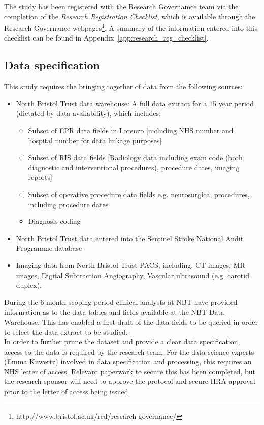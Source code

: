 \documentclass{article}
\begin{document}
The study has been registered with the Research Governamce team via
the completion of the \textit{Research Registration Checklist}, which
is available through the Research Governance
webpages\footnote{http://www.bristol.ac.uk/red/research-governance/}.
A summary of the information entered into this checklist can be found
in Appendix~\ref{app:research_reg_checklist}.

\subsection{Data specification}

This study requires the bringing together of data from the
following sources:
\begin{itemize}
\item	North Bristol Trust data warehouse: A full data extract for a 15 year period (dictated by data availability), which includes: 
  \begin{itemize}
  \item	Subset of EPR data fields in Lorenzo [including NHS number and hospital number for data linkage purposes] 
  \item	Subset of RIS data fields [Radiology data including exam code (both diagnostic and interventional procedures), procedure dates, imaging reports]
  \item	Subset of operative procedure data fields e.g. neurosurgical
    procedures, including procedure dates
  \item	Diagnosis coding
  \end{itemize}
\item	North Bristol Trust data entered into the Sentinel Stroke National Audit Programme database 
\item	Imaging data from North Bristol Trust PACS, including: CT images, MR images, Digital Subtraction Angiography, Vascular ultrasound (e.g. carotid duplex).
\end{itemize}

During the 6 month scoping period clinical analysts at NBT have
provided information as to the data tables and fields available at the
NBT Data Warehouse. This has enabled a first draft of the data fields
to be queried in order to select the data extract to be studied.\\

In order to further prune the dataset and provide a clear data
specification, access to the data is required by the research
team. For the data science experts (Emma Kuwertz) involved in data
specification and processing, this requires an NHS letter of
access. Relevant paperwork to secure this has been completed, but the
research sponsor will need to approve the protocol and secure HRA
approval prior to the letter of access being issued.\\
\end{document}
